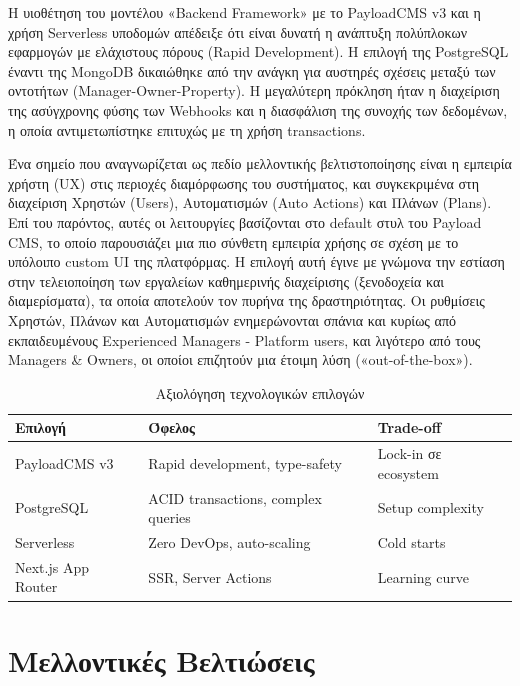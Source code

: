 \documentclass[
	12pt, %
	oneside, %
	greek,
	onehalfspacing, %
	liststotoc, %
	toctotoc, %
	parskip, %
	headsepline, %
]{MastersDoctoralThesis} %
\begin{document}
Η υιοθέτηση του μοντέλου «Backend Framework» με το PayloadCMS v3 και η χρήση Serverless υποδομών απέδειξε ότι είναι δυνατή η ανάπτυξη πολύπλοκων εφαρμογών με ελάχιστους πόρους (Rapid Development). Η επιλογή της PostgreSQL έναντι της MongoDB δικαιώθηκε από την ανάγκη για αυστηρές σχέσεις μεταξύ των οντοτήτων (Manager-Owner-Property). Η μεγαλύτερη πρόκληση ήταν η διαχείριση της ασύγχρονης φύσης των Webhooks και η διασφάλιση της συνοχής των δεδομένων, η οποία αντιμετωπίστηκε επιτυχώς με τη χρήση transactions.

Ένα σημείο που αναγνωρίζεται ως πεδίο μελλοντικής βελτιστοποίησης είναι η εμπειρία χρήστη (UX) στις περιοχές διαμόρφωσης του συστήματος, και συγκεκριμένα στη διαχείριση Χρηστών (Users), Αυτοματισμών (Auto Actions) και Πλάνων (Plans). Επί του παρόντος, αυτές οι λειτουργίες βασίζονται στο default στυλ του Payload CMS, το οποίο παρουσιάζει μια πιο σύνθετη εμπειρία χρήσης σε σχέση με το υπόλοιπο custom UI της πλατφόρμας. Η επιλογή αυτή έγινε με γνώμονα την εστίαση στην τελειοποίηση των εργαλείων καθημερινής διαχείρισης (ξενοδοχεία και διαμερίσματα), τα οποία αποτελούν τον πυρήνα της δραστηριότητας. Οι ρυθμίσεις Χρηστών, Πλάνων και Αυτοματισμών ενημερώνονται σπάνια και κυρίως από εκπαιδευμένους Experienced Managers - Platform users, και λιγότερο από τους Managers \& Owners, οι οποίοι επιζητούν μια έτοιμη λύση («out-of-the-box»).

\begin{table}[H]
\centering
\caption{Αξιολόγηση τεχνολογικών επιλογών}
\label{tab:tech-evaluation}
\begin{tabular}{@{}L{3cm}L{5cm}L{5cm}@{}}
\toprule
\textbf{Επιλογή} & \textbf{Όφελος} & \textbf{Trade-off} \\
\midrule
PayloadCMS v3 & Rapid development, type-safety & Lock-in σε ecosystem \\
PostgreSQL & ACID transactions, complex queries & Setup complexity \\
Serverless & Zero DevOps, auto-scaling & Cold starts \\
Next.js App Router & SSR, Server Actions & Learning curve \\
\bottomrule
\end{tabular}
\end{table}

\section{Μελλοντικές Βελτιώσεις}
\label{sec:future-work}
\end{document}
